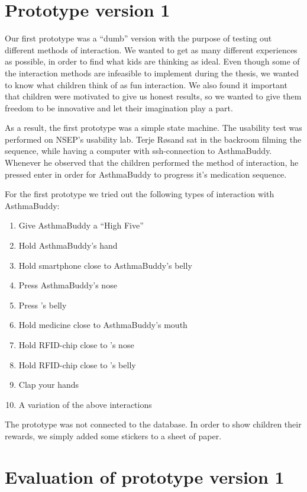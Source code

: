 

 
\section{Prototype version 1}
Our first prototype was a ``dumb'' version with the purpose of testing out different methods of interaction. We wanted to get as many different experiences as possible, in order to find what kids are thinking as ideal. Even though some of the interaction methods are infeasible to implement during the thesis, we wanted to know what children think of as fun interaction. We also found it important that children were motivated to give us honest results, so we wanted to give them freedom to be innovative and let their imagination play a part.  

As a result, the first prototype was a simple state machine. The usability test was performed on NSEP's usability lab. Terje R\o sand sat in the backroom filming the sequence, while having a computer with ssh-connection to AsthmaBuddy. Whenever he observed that the children performed the method of interaction, he pressed enter in order for AsthmaBuddy to progress it's medication sequence. 
 
For the first prototype we tried out the following types of interaction with AsthmaBuddy:
\begin{enumerate}
	\item{Give AsthmaBuddy a ``High Five''}
	\item{Hold AsthmaBuddy's hand}
	\item{Hold smartphone close to AsthmaBuddy's belly}
	\item{Press AsthmaBuddy's nose}
	\item{Press \buddy{}'s belly}
	\item{Hold medicine close to AsthmaBuddy's mouth}
	\item{Hold RFID-chip close to \buddy{}'s nose}
	\item{Hold RFID-chip close to \buddy{}'s belly}
	\item{Clap your hands}
	\item{A variation of the above interactions}
\end{enumerate}

The prototype was not connected to the database. In order to show children their rewards, we simply added some stickers to a sheet of paper. 


\section{Evaluation of prototype version 1}

